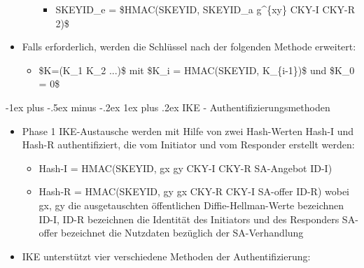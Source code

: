 \documentclass[a4paper]{article}
\makeatletter
\renewcommand{\subsubsection}{\@startsection{subsubsection}{3}{0mm}%
 {-1ex plus -.5ex minus -.2ex}%
 {1ex plus .2ex}%
 {\normalfont\small\bfseries}}
\makeatother
\begin{document}
\begin{multicols}{3}
\begin{itemize}
\begin{itemize}
                        \begin{itemize}
                            \item
                                  SKEYID\_e = \$HMAC(SKEYID, SKEYID\_a \textbar{} g\^{}\{xy\}
                                  \textbar{} CKY-I \textbar{} CKY-R \textbar{} 2)\$
                        \end{itemize}
              \end{itemize}
        \item
              Falls erforderlich, werden die Schlüssel nach der folgenden Methode
              erweitert:

              \begin{itemize}
                  \item
                        \$K=(K\_1 \textbar{} K\_2 \textbar{} ...)\$ mit \$K\_i =
                        HMAC(SKEYID, K\_\{i-1\})\$ und \$K\_0 = 0\$
              \end{itemize}
    \end{itemize}


    \subsubsection{IKE -
        Authentifizierungsmethoden}

    \begin{itemize}
        \item
              Phase 1 IKE-Austausche werden mit Hilfe von zwei Hash-Werten Hash-I
              und Hash-R authentifiziert, die vom Initiator und vom Responder
              erstellt werden:

              \begin{itemize}
                  \item
                        Hash-I = HMAC(SKEYID, gx \textbar{} gy \textbar{} CKY-I \textbar{}
                        CKY-R \textbar{} SA-Angebot \textbar{} ID-I)
                  \item
                        Hash-R = HMAC(SKEYID, gy \textbar{} gx \textbar{} CKY-R \textbar{}
                        CKY-I \textbar{} SA-offer \textbar{} ID-R) wobei gx, gy die
                        ausgetauschten öffentlichen Diffie-Hellman-Werte bezeichnen ID-I,
                        ID-R bezeichnen die Identität des Initiators und des Responders
                        SA-offer bezeichnet die Nutzdaten bezüglich der SA-Verhandlung
              \end{itemize}
        \item
              IKE unterstützt vier verschiedene Methoden der Authentifizierung:


\end{itemize}
\end{multicols}
\end{document}

